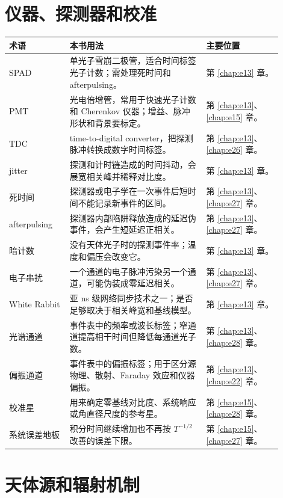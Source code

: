\section{仪器、探测器和校准}
\label{appsec:c-instrument}

\begin{longtable}{p{0.20\linewidth}p{0.45\linewidth}p{0.25\linewidth}}
\toprule
术语 & 本书用法 & 主要位置 \\
\midrule
SPAD & 单光子雪崩二极管，适合时间标签光子计数；需处理死时间和 afterpulsing。 & 第 \ref{chap:e13} 章。 \\
PMT & 光电倍增管，常用于快速光子计数和 Cherenkov 仪器；增益、脉冲形状和背景要标定。 & 第 \ref{chap:e13}、\ref{chap:e15} 章。 \\
TDC & time-to-digital converter，把探测脉冲转换成数字时间标签。 & 第 \ref{chap:e13}、\ref{chap:e26} 章。 \\
jitter & 探测和计时链造成的时间抖动，会展宽相关峰并稀释对比度。 & 第 \ref{chap:e13} 章。 \\
死时间 & 探测器或电子学在一次事件后短时间不能记录新事件的区间。 & 第 \ref{chap:e13}、\ref{chap:e27} 章。 \\
afterpulsing & 探测器内部陷阱释放造成的延迟伪事件，会产生短延迟正相关。 & 第 \ref{chap:e13}、\ref{chap:e27} 章。 \\
暗计数 & 没有天体光子时的探测事件率；温度和偏压会改变它。 & 第 \ref{chap:e13} 章。 \\
电子串扰 & 一个通道的电子脉冲污染另一个通道，可能伪装成零延迟相关。 & 第 \ref{chap:e13}、\ref{chap:e27} 章。 \\
White Rabbit & 亚 ns 级网络同步技术之一；是否足够取决于相关峰宽和基线模型。 & 第 \ref{chap:e13} 章。 \\
光谱通道 & 事件表中的频率或波长标签；窄通道提高相干时间但降低每通道光子数。 & 第 \ref{chap:e13}、\ref{chap:e28} 章。 \\
偏振通道 & 事件表中的偏振标签；用于区分源物理、散射、Faraday 效应和仪器偏振。 & 第 \ref{chap:e13}、\ref{chap:e22} 章。 \\
校准星 & 用来确定零基线对比度、系统响应或角直径尺度的参考星。 & 第 \ref{chap:e15}、\ref{chap:e28} 章。 \\
系统误差地板 & 积分时间继续增加也不再按 \(T^{-1/2}\) 改善的误差下限。 & 第 \ref{chap:e15}、\ref{chap:e27} 章。 \\
\bottomrule
\end{longtable}

\section{天体源和辐射机制}
\label{appsec:c-sources}

